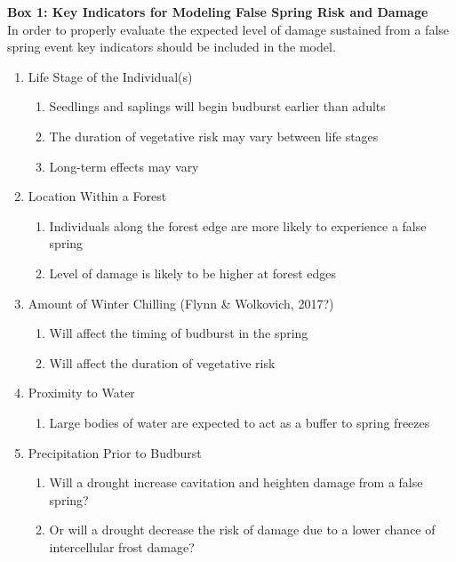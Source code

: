 \documentclass{article}\usepackage[]{graphicx}\usepackage[]{color}
\begin{document}
\captionsetup[table]{textformat=empty,labelformat=empty}
\begin{siderules}
\textbf {Box 1: Key Indicators for Modeling False Spring Risk and Damage}\\
In order to properly evaluate the expected level of damage sustained from a false spring event
key indicators should be included in the model.
\renewcommand{\theenumi}{\Roman{enumi}}
\renewcommand{\theenumii}{\roman{enumii}}
\begin{enumerate}
  \item Life Stage of the Individual(s) \citep{Caffarra2011}
  \begin{enumerate}
    \item Seedlings and saplings will begin budburst earlier than adults
    \item The duration of vegetative risk may vary between life stages
    \item Long-term effects may vary
  \end{enumerate}
  \item Location Within a Forest \citep{Augspurger2013}
  \begin{enumerate}
    \item Individuals along the forest edge are more likely to experience a false spring
    \item Level of damage is likely to be higher at forest edges
  \end{enumerate}
  \item Amount of Winter Chilling (Flynn \& Wolkovich, 2017?)
  \begin{enumerate}
    \item Will affect the timing of budburst in the spring
    \item Will affect the duration of vegetative risk
  \end{enumerate}
  \item Proximity to Water %
  \begin{enumerate}
    \item Large bodies of water are expected to act as a buffer to spring freezes
  \end{enumerate}
  \item Precipitation Prior to Budburst \citep{Anderegg2013}
  \begin{enumerate}
    \item Will a drought increase cavitation and heighten damage from a false spring?
    \item Or will a drought decrease the risk of damage due to a lower chance of intercellular frost damage?

\end{enumerate}
\end{enumerate}
\end{siderules}
\end{document}
